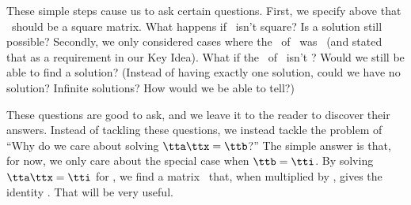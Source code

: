 \smallskip

These simple steps cause us to ask certain questions. First, we specify above that \tta\ should be a square matrix. What happens if \tta\ isn't square? Is a solution still possible? Secondly, we only considered cases where the \rref\ of \tta\ was \tti\ (and stated that as a requirement in our Key Idea). What if the \rref\ of \tta\ isn't \tti? Would we still be able to find a solution? (Instead of having exactly one solution, could we have no solution? Infinite solutions? How would we be able to tell?)


These questions are good to ask, and we leave it to the reader to discover their answers. Instead of tackling these questions, we instead tackle the problem of ``Why do we care about solving $\tta\ttx=\ttb$?'' The simple answer is that, for now, we only care about the special case when $\ttb=\tti$. By solving $\tta\ttx = \tti$ for \ttx, we find a matrix \ttx\ that, when multiplied by \tta, gives the identity \tti. That will be very useful.\\



